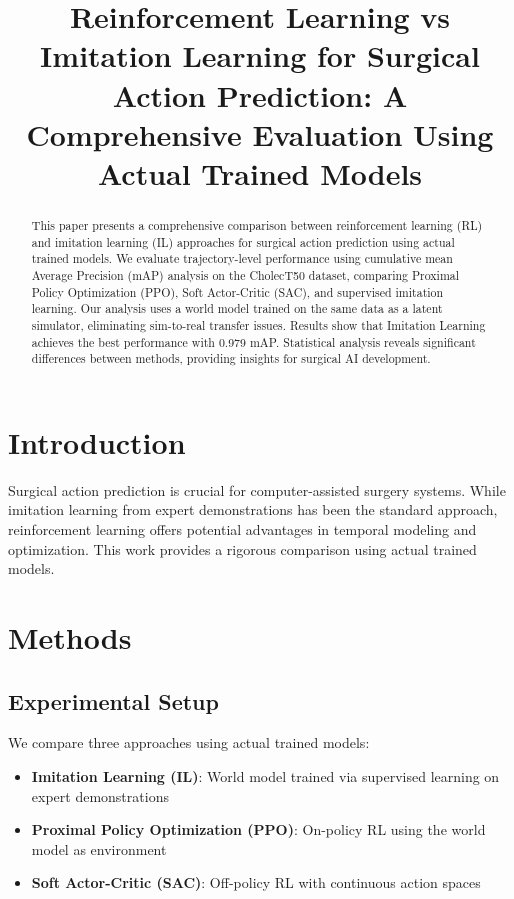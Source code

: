 \documentclass[conference]{IEEEtran}
\begin{document}
\title{Reinforcement Learning vs Imitation Learning for Surgical Action Prediction: A Comprehensive Evaluation Using Actual Trained Models}

\author{
}

\maketitle

\begin{abstract}
This paper presents a comprehensive comparison between reinforcement learning (RL) and imitation learning (IL) approaches for surgical action prediction using actual trained models. We evaluate trajectory-level performance using cumulative mean Average Precision (mAP) analysis on the CholecT50 dataset, comparing Proximal Policy Optimization (PPO), Soft Actor-Critic (SAC), and supervised imitation learning. Our analysis uses a world model trained on the same data as a latent simulator, eliminating sim-to-real transfer issues. Results show that Imitation Learning achieves the best performance with 0.979 mAP. Statistical analysis reveals significant differences between methods, providing insights for surgical AI development.
\end{abstract}

\section{Introduction}
Surgical action prediction is crucial for computer-assisted surgery systems. While imitation learning from expert demonstrations has been the standard approach, reinforcement learning offers potential advantages in temporal modeling and optimization. This work provides a rigorous comparison using actual trained models.

\section{Methods}

\subsection{Experimental Setup}
We compare three approaches using actual trained models:
\begin{itemize}
\item \textbf{Imitation Learning (IL)}: World model trained via supervised learning on expert demonstrations
\item \textbf{Proximal Policy Optimization (PPO)}: On-policy RL using the world model as environment
\item \textbf{Soft Actor-Critic (SAC)}: Off-policy RL with continuous action spaces
\end{itemize}
\end{document}

